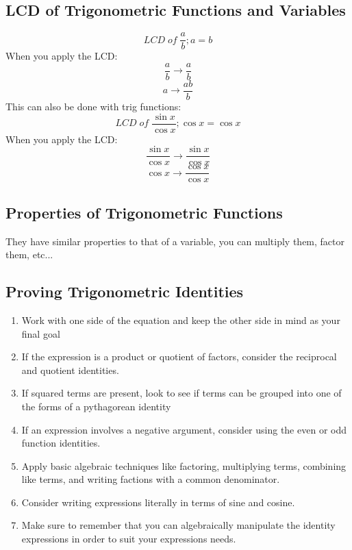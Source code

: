 \documentclass{article}
\begin{document}
\subsection{LCD of Trigonometric Functions and Variables}
\[LCD\; of\; \frac{a}{b};a = b\]
When you apply the LCD:
\[\frac{a}{b}\rightarrow \frac{a}{b}\]
\[a\rightarrow \frac{ab}{b}\]
This can also be done with trig functions:
\[LCD\;of\;\frac{\sin{x}}{\cos{x}};\cos{x}=\cos{x}\]
When you apply the LCD:
\[\frac{\sin{x}}{\cos{x}}\rightarrow\frac{\sin{x}}{\cos{x}}\]
\[\cos{x}\rightarrow\frac{\cos{x}}{\cos{x}}\]

\subsection{Properties of Trigonometric Functions}
They have similar properties to that of a variable, you can multiply them,
factor them, etc...

\subsection{Proving Trigonometric Identities}
\begin{enumerate}
  \item Work with one side of the equation and keep the other side in
    mind as your final goal

  \item If the expression is a product or quotient of factors,
    consider the reciprocal and quotient identities.

  \item If squared terms are present, look to see if terms can be
    grouped into one of the forms of a pythagorean identity

  \item If an expression involves a negative argument, consider
    using the even or odd function identities.
  
  \item Apply basic algebraic techniques like factoring, multiplying
    terms, combining like terms, and writing factions with a common
    denominator.

  \item Consider writing expressions literally in terms of sine and
    cosine.

  \item Make sure to remember that you can algebraically manipulate
    the identity expressions in order to suit your expressions
    needs.
\end{enumerate}
\end{document}
